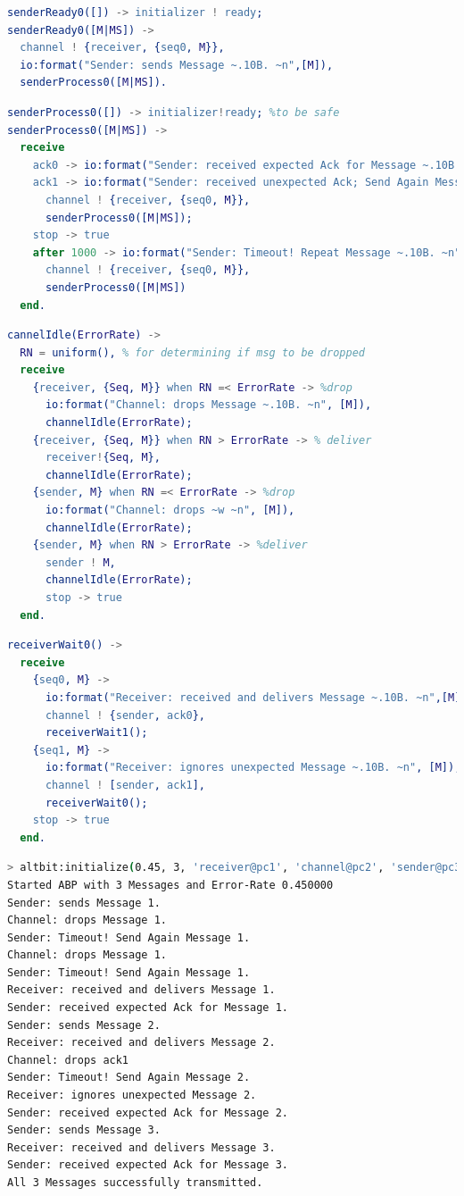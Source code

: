 \documentclass[10pt]{article}
\begin{document}
\begin{lstlisting}[language=erlang]
senderReady0([]) -> initializer ! ready;
senderReady0([M|MS]) ->
  channel ! {receiver, {seq0, M}},
  io:format("Sender: sends Message ~.10B. ~n",[M]),
  senderProcess0([M|MS]).
\end{lstlisting}

\begin{lstlisting}[language=erlang]
senderProcess0([]) -> initializer!ready; %to be safe
senderProcess0([M|MS]) ->
  receive
    ack0 -> io:format("Sender: received expected Ack for Message ~.10B. ~n", [M]);
    ack1 -> io:format("Sender: received unexpected Ack; Send Again Message ~.10B.~n", [M]),
      channel ! {receiver, {seq0, M}},
      senderProcess0([M|MS]);
    stop -> true
    after 1000 -> io:format("Sender: Timeout! Repeat Message ~.10B. ~n", [M]),
      channel ! {receiver, {seq0, M}},
      senderProcess0([M|MS])
  end.
\end{lstlisting}

\begin{lstlisting}[language=erlang]
cannelIdle(ErrorRate) ->
  RN = uniform(), % for determining if msg to be dropped
  receive
    {receiver, {Seq, M}} when RN =< ErrorRate -> %drop
      io:format("Channel: drops Message ~.10B. ~n", [M]),
      channelIdle(ErrorRate);
    {receiver, {Seq, M}} when RN > ErrorRate -> % deliver
      receiver!{Seq, M},
      channelIdle(ErrorRate);
    {sender, M} when RN =< ErrorRate -> %drop
      io:format("Channel: drops ~w ~n", [M]),
      channelIdle(ErrorRate);
    {sender, M} when RN > ErrorRate -> %deliver
      sender ! M,
      channelIdle(ErrorRate);
      stop -> true
  end.
\end{lstlisting}

\begin{lstlisting}[language=erlang]
receiverWait0() ->
  receive
    {seq0, M} ->
      io:format("Receiver: received and delivers Message ~.10B. ~n",[M]),
      channel ! {sender, ack0},
      receiverWait1();
    {seq1, M} ->
      io:format("Receiver: ignores unexpected Message ~.10B. ~n", [M]),
      channel ! [sender, ack1],
      receiverWait0();
    stop -> true
  end.  
\end{lstlisting}

\begin{lstlisting}[language=bash]
> altbit:initialize(0.45, 3, 'receiver@pc1', 'channel@pc2', 'sender@pc3').
Started ABP with 3 Messages and Error-Rate 0.450000
Sender: sends Message 1.
Channel: drops Message 1.
Sender: Timeout! Send Again Message 1.
Channel: drops Message 1.
Sender: Timeout! Send Again Message 1.
Receiver: received and delivers Message 1.
Sender: received expected Ack for Message 1.
Sender: sends Message 2.
Receiver: received and delivers Message 2.
Channel: drops ack1
Sender: Timeout! Send Again Message 2.
Receiver: ignores unexpected Message 2.
Sender: received expected Ack for Message 2.
Sender: sends Message 3.
Receiver: received and delivers Message 3.
Sender: received expected Ack for Message 3.
All 3 Messages successfully transmitted.
\end{lstlisting}
\end{document}
